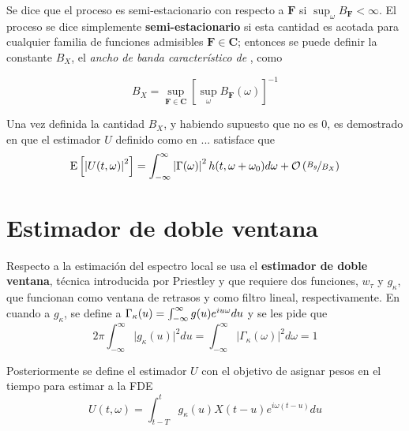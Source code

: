 Se dice que el proceso es semi-estacionario con respecto a $\mathbf{F}$ si 
$\sup_\omega B_{\mathbf{F}} < \infty$. El proceso se dice simplemente \textbf{semi-estacionario} 
si esta cantidad es acotada para cualquier familia de funciones admisibles 
$\mathbf{F} \in \mathbf{C}$; entonces se puede definir la constante $B_X$, el \textit{ancho de 
banda característico de} \xt, como

\begin{equation}
B_X = \sup_{\mathbf{F}\in \mathbf{C}} \left[ \sup_\omega B_{\mathbf{F}}(\omega) \right]^{-1}
\end{equation}

Una vez definida la cantidad $B_X$, y habiendo supuesto que no es 0, es demostrado en 
\cite{Priestley65} que el estimador $U$ definido como en ... satisface que
%
\begin{equation}
\mathrm{E}\left[ \left| U(t,\omega) \right|^{2} \right] = \int_{-\infty}^{\infty} \left| \Gamma(\omega) \right|^{2} h(t,\omega+\omega_0) d\omega
+ \mathcal{O}\left( \nicefrac{B_g}{B_X} \right)
\end{equation}


\section{Estimador de doble ventana}

Respecto a la estimación del espectro local se usa el \textbf{estimador de doble ventana}, 
técnica introducida por Priestley \cite{Priestley69} y que requiere dos funciones, $w_\tau$ y 
$g_\kappa$, que funcionan como ventana de retrasos y como filtro lineal, respectivamente.
%
En cuando a $g_\kappa$, se define a $\Gamma_\kappa(u) = \int_{-\infty}^{\infty} g(u) e^{i u \omega} du$ y se les pide que
\begin{equation*}
2\pi \int_{-\infty}^{\infty} \lvert g_\kappa(u) \lvert^{2} du 
= 
\int_{-\infty}^{\infty} \lvert \Gamma_\kappa(\omega) \lvert^{2} d\omega
= 1
\end{equation*}

Posteriormente se define el estimador $U$ con el objetivo de asignar pesos en el tiempo para estimar
a la FDE
\begin{equation*}
U(t,\omega) = \int_{t-T}^{t} g_\kappa(u) X({t-u}) e^{i \omega (t-u)} du
\end{equation*}

